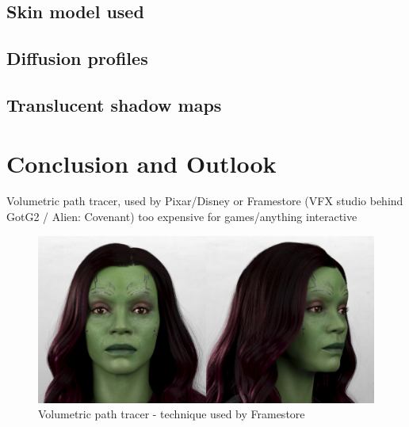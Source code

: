 \documentclass[ngerman,runningheads,a4paper]{llncs}[2018/03/10]
\begin{document}
\subsection{Skin model used}
\label{sub:skin-model}

\subsection{Diffusion profiles}
\label{sub:diffusion-profiles}

\subsection{Translucent shadow maps}
\label{sub:translucent-shadow-maps}

\citet{translucent-shadow-maps}

\section{Conclusion and Outlook}
\label{sec:outlook}

 Volumetric path tracer, used by Pixar/Disney or Framestore (VFX studio behind GotG2 / Alien: Covenant)
 too expensive for games/anything interactive

\begin{figure}
\includegraphics[scale=0.275,keepaspectratio]{./images/framestore-digital-gamora.jpg}
\caption{Volumetric path tracer - technique used by Framestore \protect\footnotemark}
\end{figure}
\end{document}
